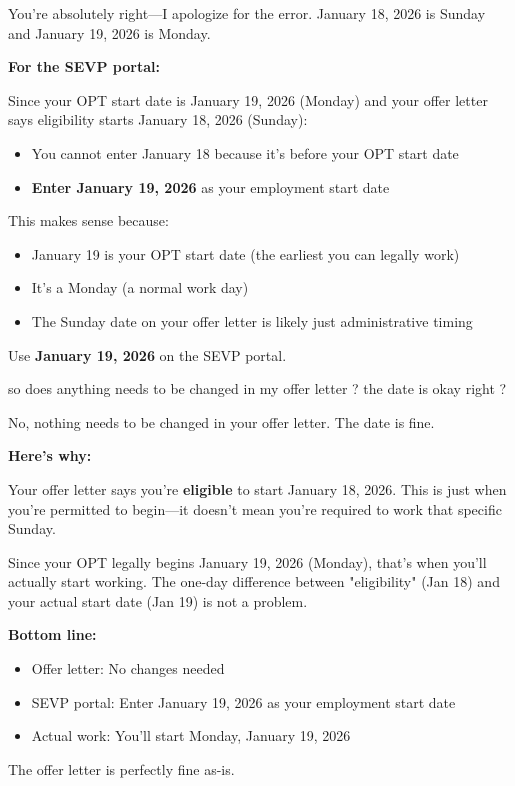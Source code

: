 \begin{botresponse}
You're absolutely right—I apologize for the error. January 18, 2026 is Sunday and January 19, 2026 is Monday.

\textbf{For the SEVP portal:}

Since your OPT start date is January 19, 2026 (Monday) and your offer letter says eligibility starts January 18, 2026 (Sunday):

\begin{itemize}
\item You cannot enter January 18 because it's before your OPT start date
\item \textbf{Enter January 19, 2026} as your employment start date
\end{itemize}

This makes sense because:

\begin{itemize}
\item January 19 is your OPT start date (the earliest you can legally work)
\item It's a Monday (a normal work day)
\item The Sunday date on your offer letter is likely just administrative timing
\end{itemize}

Use \textbf{January 19, 2026} on the SEVP portal.
\end{botresponse}

\begin{userprompt}
so does anything needs to be changed in my offer letter ? the date is okay right ?
\end{userprompt}

\begin{botresponse}
No, nothing needs to be changed in your offer letter. The date is fine.

\textbf{Here's why:}

Your offer letter says you're \textbf{eligible} to start January 18, 2026. This is just when you're permitted to begin—it doesn't mean you're required to work that specific Sunday.

Since your OPT legally begins January 19, 2026 (Monday), that's when you'll actually start working. The one-day difference between "eligibility" (Jan 18) and your actual start date (Jan 19) is not a problem.

\textbf{Bottom line:}

\begin{itemize}
\item Offer letter: No changes needed
\item SEVP portal: Enter January 19, 2026 as your employment start date
\item Actual work: You'll start Monday, January 19, 2026
\end{itemize}

The offer letter is perfectly fine as-is.
\end{botresponse}

